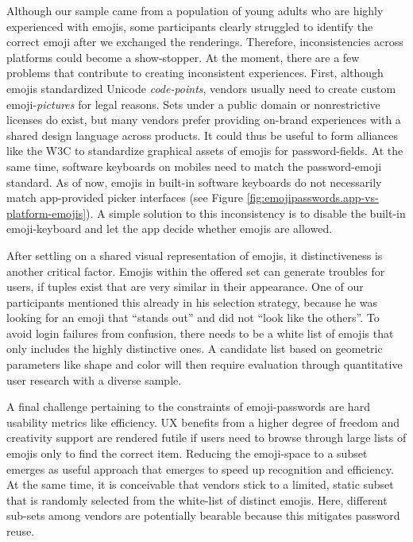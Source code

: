 Although our sample came from a population of young adults who are highly experienced with emojis, some participants clearly struggled to identify the correct emoji after we exchanged the renderings. Therefore, inconsistencies across platforms could become a show-stopper. At the moment, there are a few problems that contribute to creating inconsistent experiences. 
First, although emojis standardized Unicode \textit{code-points}, vendors usually need to create custom emoji-\textit{pictures} for legal reasons. Sets under a public domain or nonrestrictive licenses do exist, but many vendors prefer providing on-brand experiences with a shared design language across products. It could thus be useful to form alliances like the \gls{W3C} to standardize graphical assets of emojis for password-fields. At the same time, software keyboards on mobiles need to match the password-emoji standard. As of now, emojis in built-in software keyboards do not necessarily match app-provided picker interfaces (see Figure \ref{fig:emojipasswords.app-vs-platform-emojis}). A simple solution to this inconsistency is to disable the built-in emoji-keyboard and let the app decide whether emojis are allowed.

After settling on a shared visual representation of emojis, it distinctiveness is another critical factor. Emojis within the offered set can generate troubles for users, if tuples exist that are very similar in their appearance. One of our participants mentioned this already in his selection strategy, because he was looking for an emoji that ``stands out'' and did not ``look like the others''. To avoid login failures from confusion, there needs to be a white list of emojis that only includes the highly distinctive ones. A candidate list based on geometric parameters like shape and color will then require evaluation through quantitative user research with a diverse sample.

A final challenge pertaining to the constraints of emoji-passwords are hard usability metrics like efficiency. UX benefits from a higher degree of freedom and creativity support are rendered futile if users need to browse through large lists of emojis only to find the correct item. Reducing the emoji-space to a subset emerges as useful approach that emerges to speed up recognition and efficiency. At the same time, it is conceivable that vendors stick to a limited, static subset that is randomly selected from the white-list of distinct emojis. Here, different sub-sets among vendors are potentially bearable because this mitigates password reuse. 

